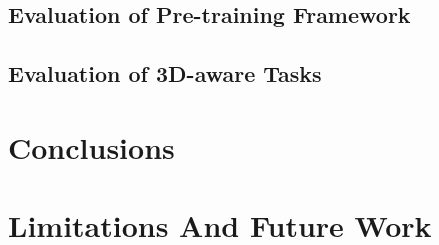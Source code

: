 \documentclass{article}
\theoremstyle{plain}
\theoremstyle{definition}
\theoremstyle{remark}
\begin{document}
\subsection{Evaluation of Pre-training Framework}
\subsection{Evaluation of 3D-aware Tasks}

\section{Conclusions}

\section{Limitations And Future Work}



\end{document}
